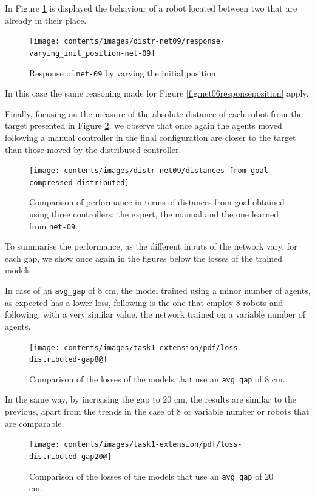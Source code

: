In Figure \ref{fig:net09responseposition} is displayed the behaviour of a robot 
located between two that are already in their place.
\begin{figure}[!htb]
	\centering
	\texttt{[image: contents/images/distr-net09/response-varying\_init\_position-net-09]}%
	\caption{Response of \texttt{net-09} by varying the initial position.}
	\label{fig:net09responseposition}
\end{figure}
In this case the same reasoning made for Figure \ref{fig:net06responseposition} 
apply.

Finally, focusing on the measure of the absolute distance of each robot from the 
target presented in Figure \ref{fig:net09distance}, we observe that once again the 
agents moved following a manual controller in the final configuration are closer 
to the target than those moved by the distributed controller.
\begin{figure}[!htb]
	\centering
	\texttt{[image: contents/images/distr-net09/distances-from-goal-compressed-distributed]}%
	\caption[Evaluation of \texttt{net-09} distances from goal.]{Comparison of 
		performance in terms of distances from goal obtained using three 
		controllers: the expert, the manual and the one learned from 
		\texttt{net-09}.}
	\label{fig:net09distance}
\end{figure}

To summarise the performance, as the different inputs of the network 
vary, for each gap, we show once again in the figures below the losses of the 
trained models.

In case of an \texttt{avg\_gap} of $8$ \gls{cm}, the model trained using 
a minor number of agents, as expected has a lower loss, following is the one that 
employ 8 robots and following, with a very similar value, the network trained on a 
variable number of agents.
\begin{figure}[!htb]
	\centering
	\texttt{[image: contents/images/task1-extension/pdf/loss-distributed-gap8@]}%
	\caption{Comparison of the losses of the models that use an \texttt{avg\_gap} 
	of $8$ \gls{cm}.}
	\label{fig:distloss8-2}
\end{figure}

In the same way, by increasing the gap to $20$ \gls{cm}, the results are similar to 
the previous, apart from the trends in the case of 8 or variable number or robots 
that are comparable.
\begin{figure}[!htb]
	\centering
	\texttt{[image: contents/images/task1-extension/pdf/loss-distributed-gap20@]}%
	\caption{Comparison of the losses of the models that use an \texttt{avg\_gap} 
	of $20$ \gls{cm}.}
	\label{fig:distloss20}
\end{figure}

